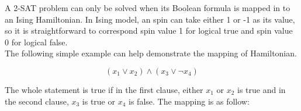 \documentclass[twoside,a4paper,article]{combine}
\begin{document}
A 2-SAT problem can only be solved when its Boolean formula is mapped in to an Ising Hamiltonian. In Ising model, an spin can take either 1 or -1 as its value, so it is straightforward to correspond spin value 1 for logical true and spin value 0 for logical false. \\

The following simple example can help demonstrate the mapping of Hamiltonian. 

\begin{equation*}
(x_1\lor x_2)\land (x_3\lor \neg x_4)
\end{equation*}

The whole statement is true if in the first clause, either $x_1$ or $x_2$ is true and in the second clause, $x_3$ is true or $x_4$ is false. The mapping is as follow:
\end{document}
